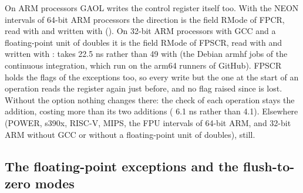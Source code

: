 \medskip
On ARM processors GAOL writes the control register itself too.\newinvfive{} With the NEON
intervals of 64-bit ARM processors the direction is the field RMode of FPCR,
read with  and written with  (). On
32-bit ARM processors with GCC and a floating-point unit of doubles it is the
field RMode of FPSCR, read with  and written with :
 takes 22.5 ns rather than 49 with 
(the Debian armhf jobs of the continuous integration, which run on the arm64
runners of GitHub). FPSCR holds the flags of the exceptions too, so every
write but the one at the start of an operation reads the register again just
before, and no flag raised since is lost. Without the option nothing changes
there: the check of each operation stays the addition,  costing
more than its two additions ( 6.1 ns rather than 4.1). Elsewhere
(POWER, s390x, RISC-V, MIPS, the FPU intervals of 64-bit ARM, and 32-bit ARM
without GCC or without a floating-point unit of doubles), 
still.

\subsection{The floating-point exceptions and the flush-to-zero modes}
\label{sec:changes-exceptions}
%

